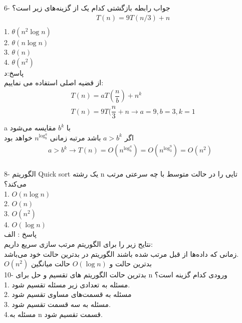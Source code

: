 \documentclass[10pt,a4paper]{article}
\begin{document}
6- جواب رابطه بازگشتی کدام یک از گزینه‌های زیر است؟\\
\begin{align*}
&T(n)=9T(n/3)+n\\
\end{align*}
1. $\theta (n^2\log n)$ \\
2. $\theta (n\log n)$\\
3. $\theta (n)$\\
4. $\theta (n^2)$\\

پاسخ:د\\
از قضیه اصلی استفاده می نماییم:\\
\begin{align*}
&T(n)=aT(\dfrac{n}{b})+n^k\\
&T(n)=9T(\dfrac{n}{3}+n \to a=9 , b=3 , k=1\\
\end{align*}
a با $b^k$ مقایسه می‌شود\\
اگر $a>b^k$ باشد مرتبه زمانی $n^{\log ^a_b}$ خواهد بود\\
\begin{align*}
a>b^k \to T(n)=O(n^{\log ^a_b})=O(n^{\log ^9_3})=O(n^2)\\
\end{align*}

8- الگوریتم Quick sort یک رشته n تایی را در حالت متوسط با چه سرعتی مرتب می‌کند؟\\

1. $O(n\log n)$\\
2. $O(n)$\\
3. $O(n^2)$\\
4. $O(\log n) $ \\

پاسخ : الف\\
نتایح زیر را برای الگوریتم مرتب سازی سریع داریم:\\
زمانی که داده‌ها از قبل مرتب شده باشند الگوریتم در بدترین حالت خود می‌باشد.\\
$O(n^2)$ بدترین حالت و $O(\log n) $  حالت میانگین\\

10- بدترین حالت الگوریتم های تقسیم و حل برای n ورودی کدام گزینه است؟\\

1. مسئله به تعدادی زیر مسئله تقسیم شود.\\
2. مسئله به قسمت‌های مساوی تقسیم شود\\
3. مسئله به سه قسمت تقسیم شود.\\
4.مسئله به n قسمت تقسیم شود.\\
\end{document}
